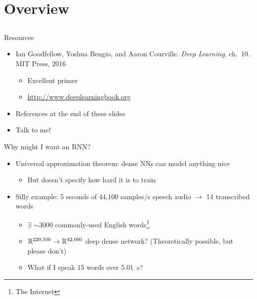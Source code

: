 \section{Overview}
\subsection{}

\begin{frame}{Resources}
    \begin{itemize}
        \item Ian Goodfellow, Yoshua Bengio, and Aaron Courville.
        \emph{Deep Learning}, ch.~10. MIT Press, 2016
        \nocite{GoodfellowDL}
        \begin{itemize}
            \item Excellent primer
            \item \textcolor{blue}{\url{http://www.deeplearningbook.org}}
        \end{itemize}
        \item References at the end of these slides
        \item Talk to me! \smiley
    \end{itemize}
\end{frame}

\begin{frame}{Why might I want an RNN?}
    \begin{itemize}
        \item Universal approximation theorem: dense NN{}s can model anything nice
        \begin{itemize}
            \item But doesn't specify how hard it is to train
        \end{itemize}
        \item Silly example: 5 seconds of 44,100 samples/s speech audio $\rightarrow$ 14 transcribed words
        \begin{itemize}
            \item $\exists$ $\sim$3000 commonly-used English words\footnote{The Internet}
            \item $\mathbb{R}^{220,500} \to \mathbb{R}^{42,000}$ deep dense network?
            (Theoretically possible, but please don't)
            \item What if I speak 15 words over 5.01~s?
        \end{itemize}
    \end{itemize}
\end{frame}

